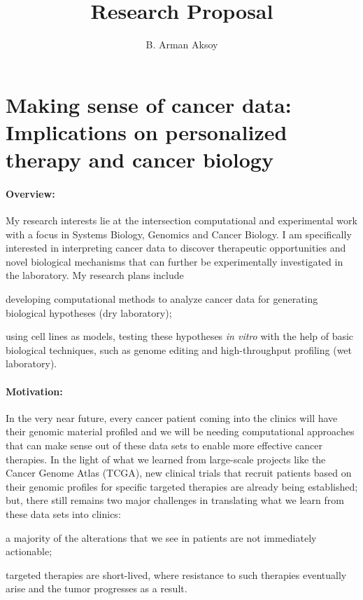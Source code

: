 \documentclass[11pt,letterpaper]{article}
\title{Research Proposal}
\author{B. Arman Aksoy}
\date{}
\begin{document}
\maketitle

\section*{Making sense of cancer data: Implications on personalized therapy and cancer biology}
\paragraph{Overview:}
My research interests lie at the intersection computational and experimental work with a focus in Systems Biology, Genomics and Cancer Biology.
I am specifically interested in interpreting cancer data to discover therapeutic opportunities and novel biological mechanisms that can further be experimentally investigated in the laboratory.
My research plans include
\begin{inparaenum}[(i)]
 \item developing computational methods to analyze cancer data for generating biological hypotheses (dry laboratory);
 \item using cell lines as models, testing these hypotheses \textit{in vitro} with the help of basic biological techniques, such as genome editing and high-throughput profiling (wet laboratory).
\end{inparaenum}

\paragraph{Motivation:}
In the very near future, every cancer patient coming into the clinics will have their genomic material profiled
and we will be needing computational approaches that can make sense out of these data sets to enable more effective cancer therapies.
In the light of what we learned from large-scale projects like the Cancer Genome Atlas (TCGA), 
new clinical trials that recruit patients based on their genomic profiles for specific targeted therapies are already being established;
but, there still remains two major challenges in translating what we learn from these data sets into clinics:
\begin{inparaenum}[(i)]
 \item a majority of the alterations that we see in patients are not immediately actionable;
 \item targeted therapies are short-lived, where resistance to such therapies eventually arise and the tumor progresses as a result.
\end{inparaenum}
\end{document}
